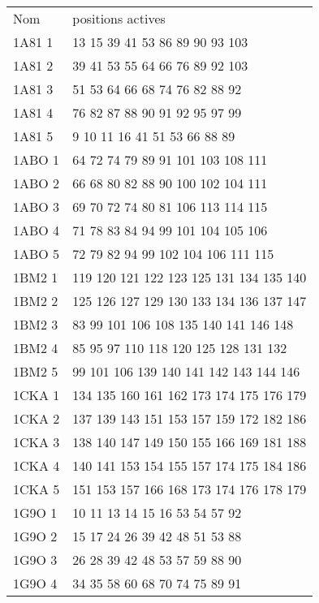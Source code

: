     \begin{table}[!htbp]
      \centering

      \begin{tabular}{ll}

        \toprule
        Nom & positions actives \\
        \cmidrule{1-2}
        1A81 1 & 13 15 39 41 53 86 89 90 93 103 \\
        1A81 2 & 39 41 53 55 64 66 76 89 92 103 \\
        1A81 3 & 51 53 64 66 68 74 76 82 88 92 \\
        1A81 4 & 76 82 87 88 90 91 92 95 97 99 \\
        1A81 5 & 9 10 11 16 41 51 53 66 88 89 \\
        1ABO 1 & 64 72 74 79 89 91 101 103 108 111 \\
        1ABO 2 & 66 68 80 82 88 90 100 102 104 111 \\
        1ABO 3 & 69 70 72 74 80 81 106 113 114 115 \\
        1ABO 4 & 71 78 83 84 94 99 101 104 105 106 \\
        1ABO 5 & 72 79 82 94 99 102 104 106 111 115 \\
        1BM2 1 & 119 120 121 122 123 125 131 134 135 140 \\
        1BM2 2 & 125 126 127 129 130 133 134 136 137 147 \\
        1BM2 3 & 83 99 101 106 108 135 140 141 146 148 \\
        1BM2 4 & 85 95 97 110 118 120 125 128 131 132 \\
        1BM2 5 & 99 101 106 139 140 141 142 143 144 146 \\
        1CKA 1 & 134 135 160 161 162 173 174 175 176 179 \\
        1CKA 2 & 137 139 143 151 153 157 159 172 182 186 \\
        1CKA 3 & 138 140 147 149 150 155 166 169 181 188 \\
        1CKA 4 & 140 141 153 154 155 157 174 175 184 186 \\
        1CKA 5 & 151 153 157 166 168 173 174 176 178 179 \\
        1G9O 1 & 10 11 13 14 15 16 53 54 57 92 \\
        1G9O 2 & 15 17 24 26 39 42 48 51 53 88 \\
        1G9O 3 & 26 28 39 42 48 53 57 59 88 90 \\
        1G9O 4 & 34 35 58 60 68 70 74 75 89 91 \\

\end{tabular}
\end{table}
